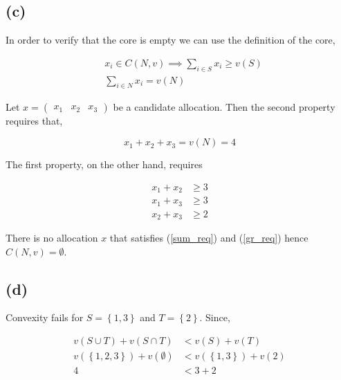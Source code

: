 \documentclass[american]{scrartcl}
\newcommand{\set}[1]{\left\{#1\right\}}
\begin{document}
\subsection*{(c)}

In order to verify that the core is empty we can use the definition of the core,

\begin{equation*}
    \begin{split}
        &x_i \in C(N, v) \implies \sum_{i \in S} x_i \geq v(S) \\
        &\sum_{i \in N} x_i = v(N)
    \end{split}
\end{equation*}

Let $x = \begin{pmatrix}
        x_1 & x_2 & x_3
    \end{pmatrix}$ be a candidate allocation. Then the second property requires that,

\begin{equation} \label{sum_req}
    x_1 + x_2 + x_3 = v(N) = 4
\end{equation}

The first property, on the other hand, requires

\begin{equation} \label{gr_req}
    \begin{split}
        x_1 + x_2 &\geq 3\\
        x_1 + x_3 &\geq 3\\
        x_2 + x_3 &\geq 2
    \end{split}
\end{equation}

There is no allocation $x$ that satisfies (\ref{sum_req}) and (\ref{gr_req}) hence $C(N, v) = \emptyset$.

\subsection*{(d)}

Convexity fails for $S = \set{1, 3}$ and $T = \set{2}$. Since,

\begin{equation}
    \begin{split}
        v\left(S \cup T\right) + v\left(S \cap T\right) &< v(S) + v(T)\\
        v(\set{1, 2, 3}) + v(\emptyset) &< v(\set{1, 3}) + v(2) \\
        4 &< 3 + 2
    \end{split}
\end{equation}
\end{document}
